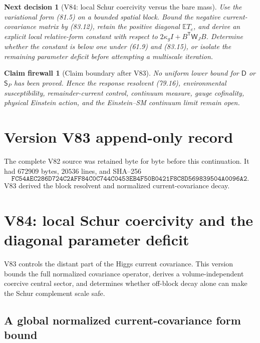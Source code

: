 \documentclass[11pt]{article}
\newtheorem{firewall}[theorem]{Claim firewall}
\newtheorem{decision}[theorem]{Next decision}
\theoremstyle{remark}
\begin{document}
\begin{decision}[V84: local Schur coercivity versus the bare mass]
\label{dec:v17v83-next}
Use the variational form (81.5) on a bounded spatial block.  Bound the
negative current-covariance matrix by (83.12), retain the positive
diagonal \(\mathbb ET_e\), and derive an explicit local relative-form
constant with respect to
\(2\kappa_gI+B^{\mathsf T}\mathsf W_JB\).  Determine whether the
constant is below one under (61.9) and (83.15), or isolate the remaining
parameter deficit before attempting a multiscale iteration.
\end{decision}

\begin{firewall}[Claim boundary after V83]
\label{fire:v17v83}
No uniform lower bound for \(\mathsf D\) or \(\mathsf S_P\) has been
proved.  Hence the response resolvent (79.16), environmental
susceptibility, remainder-current control, continuum measure, gauge
cofinality, physical Einstein action, and the Einstein--SM continuum
limit remain open.
\end{firewall}

\section*{Version V83 append-only record}
The complete V82 source was retained byte for byte before this
continuation.  It had \(672909\) bytes, \(20536\) lines, and SHA--256
\[
 \texttt{FC54AEC286D724C2AFF84C0C744C0453EB4F50B0421F8C8D569839504A0096A2}.
\]
V83 derived the block resolvent and normalized current-covariance
decay.


\section{V84: local Schur coercivity and the diagonal parameter deficit}
\label{sec:v17v84}

V83 controls the distant part of the Higgs current covariance.  This
version bounds the full normalized covariance operator, derives a
volume-independent coercive central sector, and determines whether
off-block decay alone can make the Schur complement scale safe.

\subsection{A global normalized current-covariance form bound}
\end{document}
